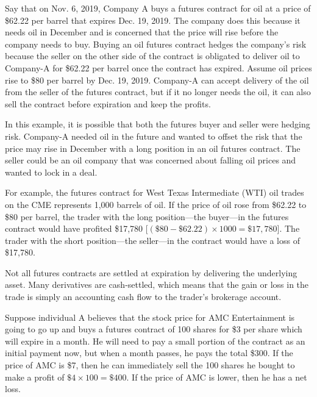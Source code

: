 \documentclass{article}
\begin{document}
    \begin{example}
      Say that on Nov. 6, 2019, Company A buys a futures contract for oil at a price of \$62.22 per barrel that expires Dec. 19, 2019. The company does this because it needs oil in December and is concerned that the price will rise before the company needs to buy. Buying an oil futures contract hedges the company's risk because the seller on the other side of the contract is obligated to deliver oil to Company-A for \$62.22 per barrel once the contract has expired. Assume oil prices rise to \$80 per barrel by Dec. 19, 2019. Company-A can accept delivery of the oil from the seller of the futures contract, but if it no longer needs the oil, it can also sell the contract before expiration and keep the profits. 

      In this example, it is possible that both the futures buyer and seller were hedging risk. Company-A needed oil in the future and wanted to offset the risk that the price may rise in December with a long position in an oil futures contract. The seller could be an oil company that was concerned about falling oil prices and wanted to lock in a deal. 

      For example, the futures contract for West Texas Intermediate (WTI) oil trades on the CME represents 1,000 barrels of oil. If the price of oil rose from \$62.22 to \$80 per barrel, the trader with the long position—the buyer—in the futures contract would have profited \$17,780 [$(\$80 - \$62.22) \times 1000 = \$17,780$]. The trader with the short position—the seller—in the contract would have a loss of \$17,780.
    \end{example}

    Not all futures contracts are settled at expiration by delivering the underlying asset. Many derivatives are cash-settled, which means that the gain or loss in the trade is simply an accounting cash flow to the trader's brokerage account. 

    \begin{example}
      Suppose individual A believes that the stock price for AMC Entertainment is going to go up and buys a futures contract of 100 shares for \$3 per share which will expire in a month. He will need to pay a small portion of the contract as an initial payment now, but when a month passes, he pays the total \$300. If the price of AMC is \$7, then he can immediately sell the 100 shares he bought to make a profit of $\$4 \times 100 = \$400$. If the price of AMC is lower, then he has a net loss. 
    \end{example}
\end{document}
